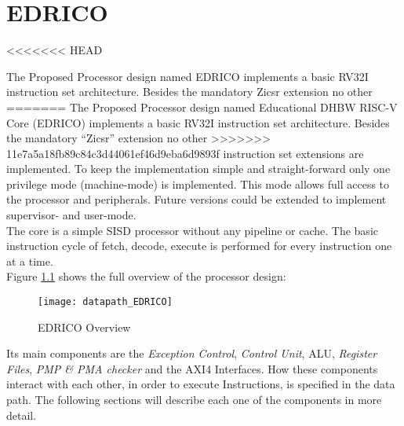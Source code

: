 
\chapter{EDRICO}
<<<<<<< HEAD

The Proposed Processor design named \ac{EDRICO} implements a basic \ac{RV32I}
instruction set architecture. Besides the mandatory Zicsr extension no other
=======
\label{chapter:edrico}
The Proposed Processor design named Educational DHBW RISC-V Core (EDRICO) implements a basic RV32I
instruction set architecture. Besides the mandatory “Zicsr” extension no other
>>>>>>> 11e7a5a18fb89c84c3d44061ef46d9eba6d9893f
instruction set extensions are implemented. To keep the implementation simple and
straight-forward only one privilege mode (machine-mode) is implemented. This mode
allows full access to the processor and peripherals. Future versions could be
extended to implement supervisor- and user-mode.\\
The core is a simple \acf{SISD} processor without any pipeline or cache. The basic instruction cycle of fetch, decode, execute is performed for every instruction one at a time.\\
Figure \ref{fig:edricooverview} shows the full overview of the processor design:

\begin{figure}[H]
	\centering
	\texttt{[image: datapath\_EDRICO]}
	\caption{EDRICO Overview}
	\label{fig:edricooverview}
\end{figure}

Its main components are the \textit{Exception Control}, \textit{Control Unit}, \ac{ALU},
\textit{Register Files}, \textit{PMP \& PMA checker} and the \ac{AXI}4 Interfaces. How these components interact with each other, in order to execute Instructions, is specified in the data path.
The following sections will describe each one of the components in more detail.

